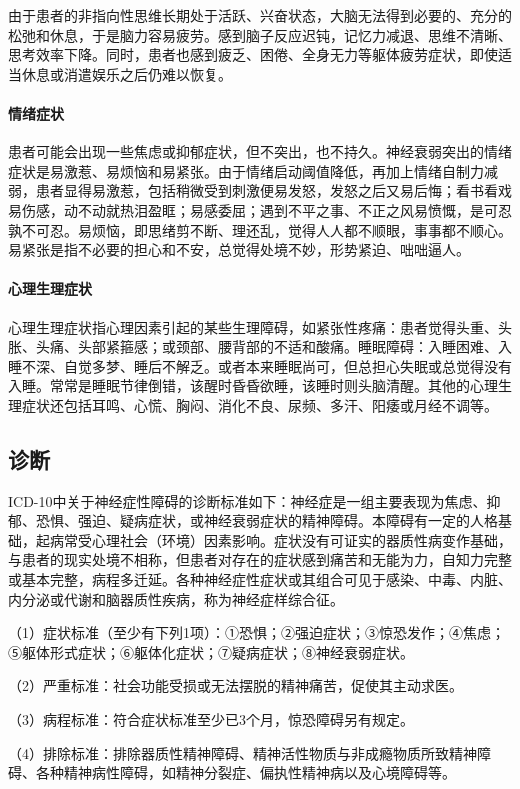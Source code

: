 由于患者的非指向性思维长期处于活跃、兴奋状态，大脑无法得到必要的、充分的松弛和休息，于是脑力容易疲劳。感到脑子反应迟钝，记忆力减退、思维不清晰、思考效率下降。同时，患者也感到疲乏、困倦、全身无力等躯体疲劳症状，即使适当休息或消遣娱乐之后仍难以恢复。
\paragraph{情绪症状}

患者可能会出现一些焦虑或抑郁症状，但不突出，也不持久。神经衰弱突出的情绪症状是易激惹、易烦恼和易紧张。由于情绪启动阈值降低，再加上情绪自制力减弱，患者显得易激惹，包括稍微受到刺激便易发怒，发怒之后又易后悔；看书看戏易伤感，动不动就热泪盈眶；易感委屈；遇到不平之事、不正之风易愤慨，是可忍孰不可忍。易烦恼，即思绪剪不断、理还乱，觉得人人都不顺眼，事事都不顺心。易紧张是指不必要的担心和不安，总觉得处境不妙，形势紧迫、咄咄逼人。
\paragraph{心理生理症状}

心理生理症状指心理因素引起的某些生理障碍，如紧张性疼痛：患者觉得头重、头胀、头痛、头部紧箍感；或颈部、腰背部的不适和酸痛。睡眠障碍：入睡困难、入睡不深、自觉多梦、睡后不解乏。或者本来睡眠尚可，但总担心失眠或总觉得没有入睡。常常是睡眠节律倒错，该醒时昏昏欲睡，该睡时则头脑清醒。其他的心理生理症状还包括耳鸣、心慌、胸闷、消化不良、尿频、多汗、阳痿或月经不调等。

\subsection{诊断}

ICD-10中关于神经症性障碍的诊断标准如下：神经症是一组主要表现为焦虑、抑郁、恐惧、强迫、疑病症状，或神经衰弱症状的精神障碍。本障碍有一定的人格基础，起病常受心理社会（环境）因素影响。症状没有可证实的器质性病变作基础，与患者的现实处境不相称，但患者对存在的症状感到痛苦和无能为力，自知力完整或基本完整，病程多迁延。各种神经症性症状或其组合可见于感染、中毒、内脏、内分泌或代谢和脑器质性疾病，称为神经症样综合征。

（1）症状标准（至少有下列1项）：①恐惧；②强迫症状；③惊恐发作；④焦虑；⑤躯体形式症状；⑥躯体化症状；⑦疑病症状；⑧神经衰弱症状。

（2）严重标准：社会功能受损或无法摆脱的精神痛苦，促使其主动求医。

（3）病程标准：符合症状标准至少已3个月，惊恐障碍另有规定。

（4）排除标准：排除器质性精神障碍、精神活性物质与非成瘾物质所致精神障碍、各种精神病性障碍，如精神分裂症、偏执性精神病以及心境障碍等。

